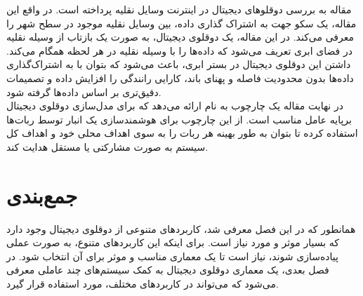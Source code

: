 مقاله 
\cite{b10}
به بررسی دوقلو‌های دیجیتال در اینترنت وسایل‌ نقلیه
پرداخته است. در واقع این مقاله، یک سکو
جهت به اشتراک گذاری داده، بین وسایل نقلیه موجود در سطح شهر را معرفی می‌کند. در این مقاله، یک دوقلوی دیجیتال، به صورت یک بازتاب از وسیله نقلیه در فضای ابری تعریف می‌شود که داده‌ها را با وسیله نقلیه در هر لحظه همگام می‌کند. داشتن این دوقلوی دیجیتال در بستر ابری، باعث می‌شود که بتوان با به اشتراک‌گذاری داده‌ها بدون محدودیت فاصله و پهنای باند، کارایی رانندگی را افزایش داده و تصمیمات دقیق‌تری بر اساس داده‌ها گرفته‌ شود.\\
در نهایت مقاله 
\cite{b11}
یک چارچوب
به نام 
ارائه می‌دهد که برای مدل‌سازی دوقلوی دیجیتال برپایه عامل‌
مناسب است. از این چارچوب برای هوشمند‌سازی یک انبار‌ توسط ربات‌ها استفاده کرده تا بتوان به طور بهینه هر ربات را به سوی اهداف محلی خود و اهداف کل سیستم به صورت مشارکتی یا مستقل هدایت کند.

\section{جمع‌بندی}
همانطور که در این فصل معرفی شد، کاربرد‌های متنوعی از دوقلوی دیجیتال وجود دارد که بسیار موثر و مورد نیاز است. برای اینکه این کاربرد‌های متنوع، به صورت عملی پیاده‌سازی شوند، نیاز است تا یک معماری مناسب و موثر برای آن انتخاب شود. در فصل بعدی، یک معماری دوقلوی دیجیتال به کمک سیستم‌های چند‌ عاملی معرفی می‌شود که می‌تواند در کاربرد‌های مختلف، مورد استفاده قرار گیرد.

